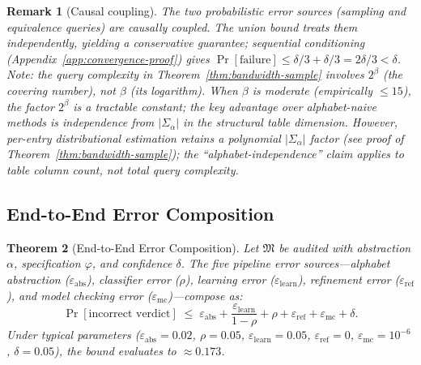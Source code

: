 \documentclass[11pt]{article}
\newtheorem{theorem}{Theorem}[section]
\newtheorem{remark}[theorem]{Remark}
\begin{document}
\begin{remark}[Causal coupling]\label{rem:causal}
The two probabilistic error sources (sampling and equivalence queries)
are causally coupled.  The union bound treats them independently,
yielding a conservative guarantee; sequential conditioning
(Appendix~\ref{app:convergence-proof}) gives
$\Pr[\text{failure}] \le \delta/3 + \delta/3 = 2\delta/3 < \delta$.
Note: the query complexity in Theorem~\ref{thm:bandwidth-sample}
involves $2^\beta$ (the covering number), not $\beta$ (its logarithm).
When $\beta$ is moderate (empirically $\le 15$), the factor $2^\beta$
is a tractable constant; the key advantage over alphabet-naive methods
is independence from $|\Sigma_\alpha|$ in the \emph{structural}
table dimension.  However, per-entry distributional estimation
retains a polynomial $|\Sigma_\alpha|$ factor (see proof of
Theorem~\ref{thm:bandwidth-sample});
the ``alphabet-independence'' claim applies to table column count,
not total query complexity.
\end{remark}

\subsection{End-to-End Error Composition}

\begin{theorem}[End-to-End Error Composition]\label{thm:e2e-error}
Let $\mathfrak{M}$ be audited with abstraction $\alpha$, specification
$\varphi$, and confidence $\delta$.  The five pipeline error
sources---alphabet abstraction ($\varepsilon_{\mathrm{abs}}$),
classifier error ($\rho$), learning error
($\varepsilon_{\mathrm{learn}}$), refinement error
($\varepsilon_{\mathrm{ref}}$), and model checking error
($\varepsilon_{\mathrm{mc}}$)---compose as:
\begin{equation}\label{eq:e2e}
  \Pr[\text{incorrect verdict}] \;\le\;
  \varepsilon_{\mathrm{abs}}
  + \frac{\varepsilon_{\mathrm{learn}}}{1 - \rho} + \rho
  + \varepsilon_{\mathrm{ref}}
  + \varepsilon_{\mathrm{mc}}
  + \delta.
\end{equation}
Under typical parameters ($\varepsilon_{\mathrm{abs}} = 0.02$,
$\rho = 0.05$, $\varepsilon_{\mathrm{learn}} = 0.05$,
$\varepsilon_{\mathrm{ref}} = 0$,
$\varepsilon_{\mathrm{mc}} = 10^{-6}$, $\delta = 0.05$),
the bound evaluates to ${\approx}0.173$.
\end{theorem}
\end{document}
